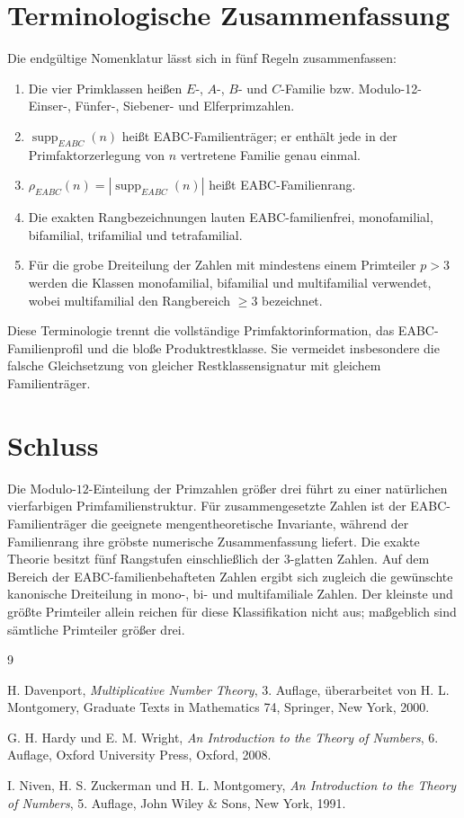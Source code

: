 \documentclass[11pt,a4paper,reqno]{amsart}
\theoremstyle{definition}
\theoremstyle{remark}
\newcommand{\suppE}{\operatorname{supp}_{EABC}}
\newcommand{\rankE}{\rho_{EABC}}
\begin{document}
\section{Terminologische Zusammenfassung}

Die endgültige Nomenklatur lässt sich in fünf Regeln zusammenfassen:
\begin{enumerate}[label=\textbf{T\arabic*.}]
    \item Die vier Primklassen heißen $E$-, $A$-, $B$- und $C$-Familie bzw. Modulo-12-Einser-, Fünfer-, Siebener- und Elferprimzahlen.
    \item $\suppE(n)$ heißt EABC-Familienträger; er enthält jede in der Primfaktorzerlegung von $n$ vertretene Familie genau einmal.
    \item $\rankE(n)=|\suppE(n)|$ heißt EABC-Familienrang.
    \item Die exakten Rangbezeichnungen lauten EABC-familienfrei, monofamilial, bifamilial, trifamilial und tetrafamilial.
    \item Für die grobe Dreiteilung der Zahlen mit mindestens einem Primteiler $p>3$ werden die Klassen monofamilial, bifamilial und multifamilial verwendet, wobei multifamilial den Rangbereich $\ge3$ bezeichnet.
\end{enumerate}

Diese Terminologie trennt die vollständige Primfaktorinformation, das EABC-Familienprofil und die bloße Produktrestklasse. Sie vermeidet insbesondere die falsche Gleichsetzung von gleicher Restklassensignatur mit gleichem Familienträger.

\section{Schluss}

Die Modulo-$12$-Einteilung der Primzahlen größer drei führt zu einer natürlichen vierfarbigen Primfamilienstruktur. Für zusammengesetzte Zahlen ist der EABC-Familienträger die geeignete mengentheoretische Invariante, während der Familienrang ihre gröbste numerische Zusammenfassung liefert. Die exakte Theorie besitzt fünf Rangstufen einschließlich der $3$-glatten Zahlen. Auf dem Bereich der EABC-familienbehafteten Zahlen ergibt sich zugleich die gewünschte kanonische Dreiteilung in mono-, bi- und multifamiliale Zahlen. Der kleinste und größte Primteiler allein reichen für diese Klassifikation nicht aus; maßgeblich sind sämtliche Primteiler größer drei.

\begin{thebibliography}{9}

H. Davenport,
\emph{Multiplicative Number Theory},
3. Auflage, überarbeitet von H. L. Montgomery,
Graduate Texts in Mathematics 74, Springer, New York, 2000.

G. H. Hardy und E. M. Wright,
\emph{An Introduction to the Theory of Numbers},
6. Auflage, Oxford University Press, Oxford, 2008.

I. Niven, H. S. Zuckerman und H. L. Montgomery,
\emph{An Introduction to the Theory of Numbers},
5. Auflage, John Wiley \& Sons, New York, 1991.

\end{thebibliography}
\end{document}
